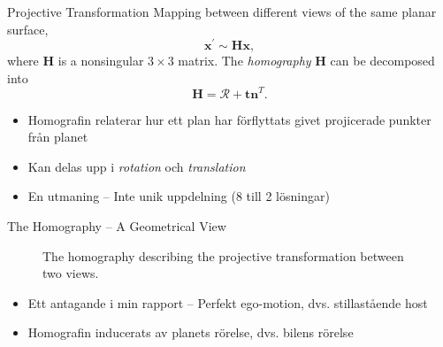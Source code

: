 \documentclass{beamer}
\renewcommand{\a}{\r{a}\xspace}
\renewcommand{\o}{\"o\xspace}
\renewcommand{\H}{\bm{H}}
\newcommand{\rotmat}{\bm{\mathcal{R}}}
\begin{document}
\begin{frame}{Projective Transformation}
	Mapping between different views of the same planar surface,
	\begin{equation*}
		\bm{x}^\prime \sim \H \bm{x},
	\end{equation*}
	where $\H$ is a nonsingular $3 \times 3$ matrix.
	\vspace{1em}
	The \textit{homography} $\H$ can be decomposed into
	\begin{equation*}
		\H = \rotmat + \bm{t} \bm{n}^T.
	\end{equation*}

	\note
	{
		\begin{itemize}
			\item Homografin relaterar hur ett plan har f\o{}rflyttats givet projicerade punkter fr\a{}n planet
			\item Kan delas upp i \textit{rotation} och \textit{translation}
			\item En utmaning -- Inte unik uppdelning (8 till 2 l\o{}sningar)
		\end{itemize}
	}
\end{frame}

\begin{frame}{The Homography -- A Geometrical View}
	\begin{figure}
		\centering
		\caption{The homography describing the projective transformation between two views.}
	\end{figure}

	\note
	{
		\begin{itemize}
			\item Ett antagande i min rapport -- Perfekt ego-motion, dvs. stillast\a{}ende host
			\item Homografin inducerats av planets r\o{}relse, dvs. bilens r\o{}relse
		\end{itemize}
	}
\end{frame}
\end{document}
